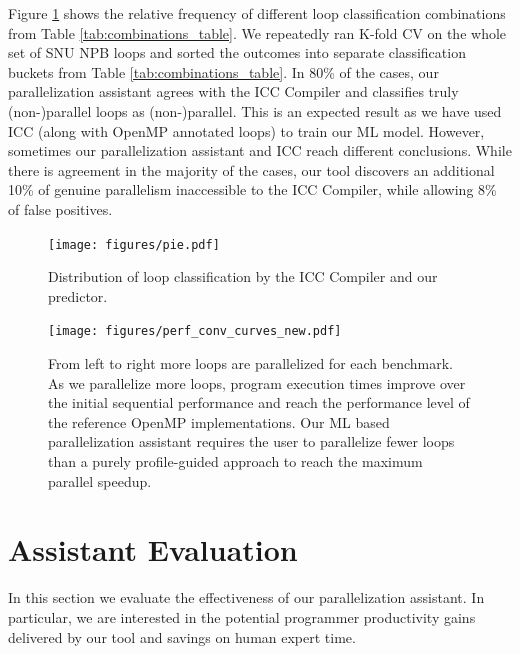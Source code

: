 Figure \ref{fig:icc_competition} shows the relative frequency of different loop classification combinations from Table \ref{tab:combinations_table}. We repeatedly ran K-fold CV on the whole set of SNU NPB loops and sorted the outcomes into separate classification buckets from Table \ref{tab:combinations_table}. In 80\% of the cases, our parallelization assistant agrees with the ICC Compiler and classifies truly (non-)parallel loops as (non-)parallel. This is an expected result as we have used ICC (along with OpenMP annotated loops) to train our ML model. However, sometimes our parallelization assistant and ICC reach different conclusions. While there is agreement in the majority of the cases, our tool discovers an additional 10\% of genuine parallelism inaccessible to the ICC Compiler, while allowing 8\% of false positives.

\begin{figure}[t!]
    \centering
    \texttt{[image: figures/pie.pdf]}
    \caption{
      Distribution of loop classification by the ICC Compiler and our predictor.}
    \label{fig:icc_competition}
\vspace*{-5mm}
\end{figure}

\begin{figure}[t!]
\centering
\texttt{[image: figures/perf\_conv\_curves\_new.pdf]}
\caption{From left to right more loops are parallelized for each benchmark. As we parallelize more loops, program execution times improve over the initial sequential performance and reach the performance level of the reference OpenMP implementations. Our ML based parallelization assistant requires the user to parallelize fewer loops than a purely profile-guided approach to reach the maximum parallel speedup.}
\label{fig:performance_convergence_line}
\vspace*{5mm} %
\end{figure}

\section{Assistant Evaluation}
\label{evaluation}

In this section we evaluate the effectiveness of our parallelization assistant. In particular, we are interested in the potential programmer productivity gains delivered by our tool and savings on human expert time.

